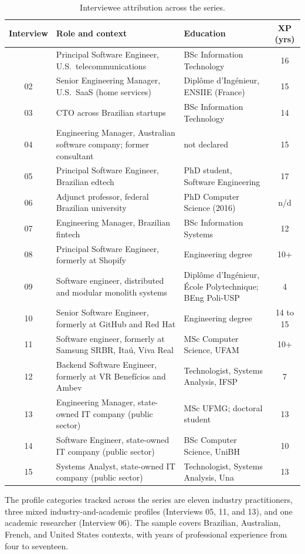 \begin{longtable}{c p{6.0cm} p{4.6cm} c}
\caption{Interviewee attribution across the series.}
\label{tab:interviews-attribution}\\
\toprule
\textbf{Interview} & \textbf{Role and context} & \textbf{Education} & \textbf{XP (yrs)} \\
\midrule
\endhead
\bottomrule
\endfoot
01 & Principal Software Engineer, U.S.\ telecommunications & BSc Information Technology & 16 \\
02 & Senior Engineering Manager, U.S.\ SaaS (home services) & Dipl\^ome d'Ing\'enieur, ENSIIE (France) & 15 \\
03 & CTO across Brazilian startups & BSc Information Technology & 14 \\
04 & Engineering Manager, Australian software company; former consultant & not declared & 15 \\
05 & Principal Software Engineer, Brazilian edtech & PhD student, Software Engineering & 17 \\
06 & Adjunct professor, federal Brazilian university & PhD Computer Science (2016) & n/d \\
07 & Engineering Manager, Brazilian fintech & BSc Information Systems & 12 \\
08 & Principal Software Engineer, formerly at Shopify & Engineering degree & 10+ \\
09 & Software engineer, distributed and modular monolith systems & Dipl\^ome d'Ing\'enieur, \'Ecole Polytechnique; BEng Poli-USP & 4 \\
10 & Senior Software Engineer, formerly at GitHub and Red Hat & Engineering degree & 14 to 15 \\
11 & Software engineer, formerly at Samsung SRBR, Ita\'u, Viva Real & MSc Computer Science, UFAM & 10+ \\
12 & Backend Software Engineer, formerly at VR Benef\'icios and Ambev & Technologist, Systems Analysis, IFSP & 7 \\
13 & Engineering Manager, state-owned IT company (public sector) & MSc UFMG; doctoral student & 13 \\
14 & Software Engineer, state-owned IT company (public sector) & BSc Computer Science, UniBH & 10 \\
15 & Systems Analyst, state-owned IT company (public sector) & Technologist, Systems Analysis, Una & 13 \\
\end{longtable}

The profile categories tracked across the series are eleven industry practitioners, three mixed industry-and-academic profiles (Interviews 05, 11, and 13), and one academic researcher (Interview 06). The sample covers Brazilian, Australian, French, and United States contexts, with years of professional experience from four to seventeen.

